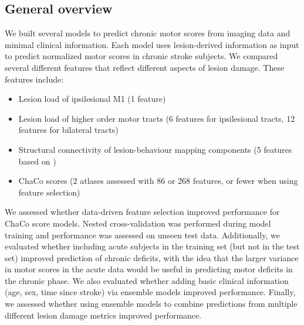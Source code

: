 \documentclass[10pt]{article}
\begin{document}
\subsection{General overview}

We built several models to predict chronic motor scores from imaging data and minimal clinical information. Each model uses lesion-derived information as input to predict normalized motor scores in chronic stroke subjects. We compared several different features that reflect different aspects of lesion damage. These features include:

\begin{itemize}
\item Lesion load of ipsilesional M1 (1 feature)
\item Lesion load of higher order motor tracts (6 features for ipsilesional tracts, 12 features for bilateral tracts)
\item Structural connectivity of lesion-behaviour mapping components (5 features based on \cite{Bowren2022-rs})
\item ChaCo scores (2 atlases assessed with 86 or 268 features, or fewer when using feature selection)
\end{itemize}

We assessed whether data-driven feature selection improved performance for ChaCo score models. Nested cross-validation was performed during model training and performance was assessed on unseen test data.  Additionally, we evaluated whether including acute subjects in the training set (but not in the test set) improved prediction of chronic deficits, with the idea that the larger variance in motor scores in the acute data would be useful in predicting motor deficits in the chronic phase. We also evaluated whether adding basic clinical information (age, sex, time since stroke) via ensemble models improved performance. Finally, we assessed whether using ensemble models to combine predictions from multiple different lesion damage metrics improved performance.
\end{document}
